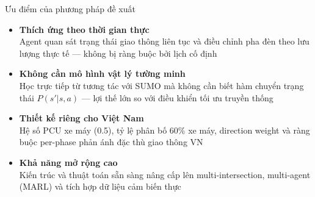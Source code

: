 \begin{frame}{Ưu điểm của phương pháp đề xuất}
  \begin{itemize}
    \setlength{\itemsep}{8pt}
    \item \textbf{Thích ứng theo thời gian thực}\\
          Agent quan sát trạng thái giao thông liên tục và điều chỉnh pha đèn theo lưu lượng thực tế --- không bị ràng buộc bởi lịch cố định

    \item \textbf{Không cần mô hình vật lý tường minh}\\
          Học trực tiếp từ tương tác với SUMO mà không cần biết hàm chuyển trạng thái $P(s'|s,a)$ --- lợi thế lớn so với điều khiển tối ưu truyền thống

    \item \textbf{Thiết kế riêng cho Việt Nam}\\
          Hệ số PCU xe máy (0.5), tỷ lệ phân bố 60\% xe máy, direction weight và ràng buộc per-phase phản ánh đặc thù giao thông VN

    \item \textbf{Khả năng mở rộng cao}\\
          Kiến trúc và thuật toán sẵn sàng nâng cấp lên multi-intersection, multi-agent (MARL) và tích hợp dữ liệu cảm biến thực
  \end{itemize}
\end{frame}

